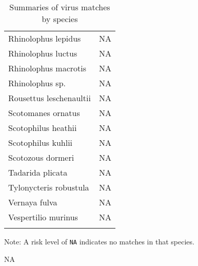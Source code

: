 \documentclass[11pt,article,oneside]{article}
\begin{document}
\begin{longtable}[c]{@{}lr@{}}
Rhinolophus lepidus & NA
\\\addlinespace
Rhinolophus luctus & NA
\\\addlinespace
Rhinolophus macrotis & NA
\\\addlinespace
Rhinolophus sp. & NA
\\\addlinespace
Rousettus leschenaultii & NA
\\\addlinespace
Scotomanes ornatus & NA
\\\addlinespace
Scotophilus heathii & NA
\\\addlinespace
Scotophilus kuhlii & NA
\\\addlinespace
Scotozous dormeri & NA
\\\addlinespace
Tadarida plicata & NA
\\\addlinespace
Tylonycteris robustula & NA
\\\addlinespace
Vernaya fulva & NA
\\\addlinespace
Vespertilio murinus & NA
\\\addlinespace
\bottomrule
\addlinespace
\caption{Summaries of virus matches by species}
\end{longtable}

Note: A risk level of \texttt{NA} indicates no matches in that species.

NA
\end{document}
